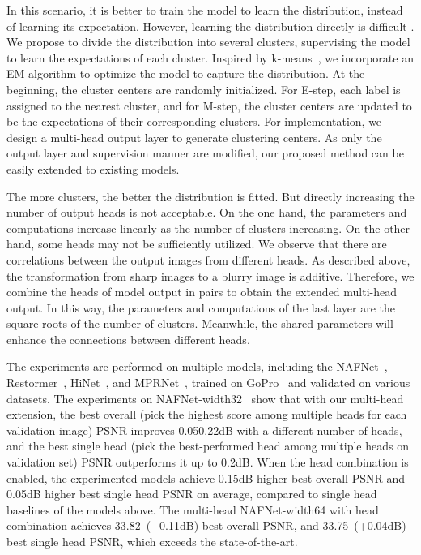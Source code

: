 \documentclass[letterpaper]{article} \usepackage{aaai23}  \usepackage{times}  \usepackage{helvet}  \usepackage{courier}  \usepackage[hyphens]{url}  \usepackage{graphicx} \urlstyle{rm} \def\UrlFont{\rm}  \usepackage{natbib}  \usepackage{caption} \frenchspacing  \setlength{\pdfpagewidth}{8.5in} \setlength{\pdfpageheight}{11in} \usepackage{algorithm}
\begin{document}
In this scenario, it is better to train the model to learn the distribution, instead of learning its expectation. However, learning the distribution directly is difficult \cite{kingma2013vae}. We propose to divide the distribution into several clusters, supervising the model to learn the expectations of each cluster. Inspired by k-means~\cite{lloyd1982least}, we incorporate an EM algorithm to optimize the model to capture the distribution. At the beginning, the cluster centers are randomly initialized. For E-step, each label is assigned to the nearest cluster, and for M-step, the cluster centers are updated to be the expectations of their corresponding clusters. For implementation, we design a multi-head output layer to generate clustering centers. As only the output layer and supervision manner are modified, our proposed method can be easily extended to existing models.

The more clusters, the better the distribution is fitted. But directly increasing the number of output heads is not acceptable. On the one hand, the parameters and computations increase linearly as the number of clusters increasing. On the other hand, some heads may not be sufficiently utilized. We observe that there are correlations between the output images from different heads. As described above, the transformation from sharp images to a blurry image is additive. Therefore, we combine the heads of model output in pairs to obtain the extended multi-head output. In this way, the parameters and computations of the last layer are the square roots of the number of clusters. Meanwhile, the shared parameters will enhance the connections between different heads.





The experiments are performed on multiple models, including the NAFNet~\cite{chen2022simple}, Restormer~\cite{zamir2022restormer}, HiNet~\cite{chen2021hinet}, and MPRNet~\cite{zamir2021multi}, trained on GoPro~\cite{Nah_2017_CVPR} and validated on various datasets. The experiments on NAFNet-width32~\cite{chen2022simple} show that with our multi-head extension, the best overall (pick the highest score among multiple heads for each validation image) PSNR improves 0.050.22dB with a different number of heads, and the best single head (pick the best-performed head among multiple heads on validation set) PSNR outperforms it up to 0.2dB. When the head combination is enabled, the experimented models achieve 0.15dB higher best overall PSNR and 0.05dB higher best single head PSNR on average, compared to single head baselines of the models above. The multi-head NAFNet-width64 with head combination achieves 33.82~(+0.11dB) best overall PSNR, and 33.75~(+0.04dB) best single head PSNR, which exceeds the state-of-the-art.
\end{document}
